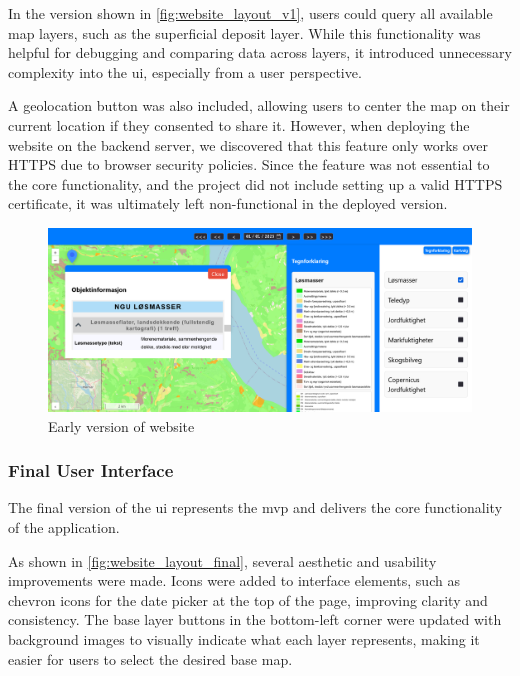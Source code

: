 In the version shown in \autoref{fig:website_layout_v1}, users could query all available map layers, such as the superficial deposit layer. While this functionality was helpful for debugging and comparing data across layers, it introduced unnecessary complexity into the \acrshort{ui}, especially from a user perspective.

A geolocation button was also included, allowing users to center the map on their current location if they consented to share it. However, when deploying the website on the backend server, we discovered that this feature only works over HTTPS due to browser security policies. Since the feature was not essential to the core functionality, and the project did not include setting up a valid HTTPS certificate, it was ultimately left non-functional in the deployed version.

\begin{figure}[h]
    \centering
    \includegraphics[width=1\linewidth]{figures/website_layout_v1.pdf}
    \caption{Early version of website}
    \label{fig:website_layout_v1}
\end{figure}

\subsubsection*{Final User Interface}

The final version of the \acrshort{ui} represents the \acrfull{mvp} and delivers the core functionality of the application.

As shown in \autoref{fig:website_layout_final}, several aesthetic and usability improvements were made. Icons were added to interface elements, such as chevron icons for the date picker at the top of the page, improving clarity and consistency. The base layer buttons in the bottom-left corner were updated with background images to visually indicate what each layer represents, making it easier for users to select the desired base map.

